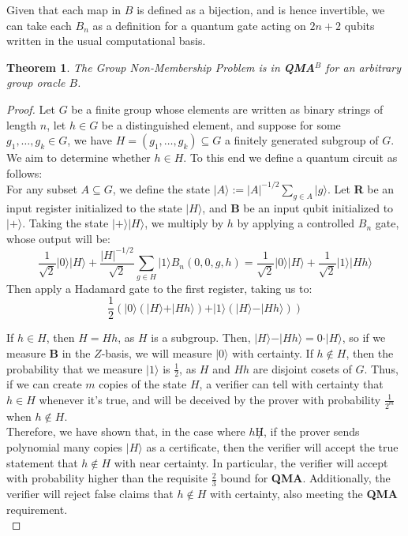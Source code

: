 \documentclass[12pt]{article}
\newtheorem{thm}{Theorem}
\numberwithin{thm}{section}
\numberwithin{defn}{section}
\numberwithin{prop}{section}
\numberwithin{rmk}{section}
\newcommand{\ket}[1]{\vert #1 \rangle}
\begin{document}
	Given that each map in $B$ is defined as a bijection, and is hence invertible, we can take each $B_n$ as a definition for a quantum gate acting on $2n+2$ qubits written in the usual computational basis.
	\begin{thm}
		The Group Non-Membership Problem is in \textbf{QMA$^B$} for an arbitrary group oracle $B$.
	\end{thm}
	\begin{proof}
		Let $G$ be a finite group whose elements are written as binary strings of length $n$, let $h\in G$ be a distinguished element, and suppose for some $g_1,\dots,g_k\in G$, we have $H=(g_1,\dots,g_k)\subseteq G$ a finitely generated subgroup of $G$. We aim to determine whether $h\in H$. To this end we define a quantum circuit as follows:\\
		
		 For any subset $A\subseteq G$, we define the state $\ket{A}:=|A|^{-1/2}\sum_{g\in A}\ket{g}$. Let \textbf{R} be an input register initialized to the state $\ket{H}$, and \textbf{B} be an input qubit initialized to $\ket{+}$. Taking the state $\ket{+}\ket{H}$, we multiply by $h$ by applying a controlled $B_n$ gate, whose output will be:
		 \[\frac{1}{\sqrt{2}}\ket{0}\ket{H}+\frac{|H|^{-1/2}}{\sqrt{2}}\sum_{g\in H}\ket{1}B_n(0,0,g,h)=\frac{1}{\sqrt{2}}\ket{0}\ket{H}+\frac{1}{\sqrt{2}}\ket{1}\ket{Hh}\]
		 Then apply a Hadamard gate to the first register, taking us to:
		 \[\frac{1}{2}(\ket{0}(\ket{H}+\ket{Hh})+\ket{1}(\ket{H}-\ket{Hh}))\]
		
		If $h\in H$, then $H=Hh$, as $H$ is a subgroup. Then, $\ket{H}-\ket{Hh}=0\cdot\ket{H}$, so if we measure \textbf{B} in the $Z$-basis, we will measure $\ket{0}$ with certainty. If $h\notin H$, then the probability that we measure $\ket{1}$ is $\frac{1}{2}$, as $H$ and $Hh$ are disjoint cosets of $G$. Thus, if we can create $m$ copies of the state $H$, a verifier can tell with certainty that $h\in H$ whenever it's true, and will be deceived by the prover with probability $\frac{1}{2^m}$ when $h\notin H$.\\
		
		Therefore, we have shown that, in the case where $h\not H$, if the prover sends polynomial many copies $\ket{H}$ as a certificate, then the verifier will accept the true statement that $h\notin H$ with near certainty. In particular, the verifier will accept with probability higher than the requisite $\frac{2}{3}$ bound for \textbf{QMA}. Additionally, the verifier will reject false claims that $h\notin H$ with certainty, also meeting the \textbf{QMA} requirement. \\
		

\end{proof}
\end{document}
